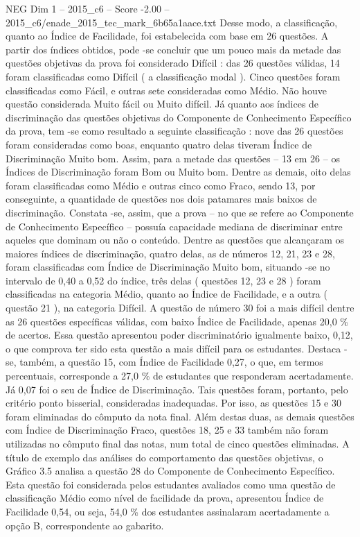 \begin{textsample}{NEG Dim 1 – 2015\_c6 – Score -2.00 – 2015\_c6/enade\_2015\_tec\_mark\_6b65a1aace.txt}
Desse modo, a classificação, quanto ao Índice de Facilidade, foi estabelecida com base em 26 questões.
A partir dos índices obtidos, pode -se concluir que um pouco mais da metade das questões objetivas da prova foi considerado Difícil : das 26 questões válidas, 14 foram classificadas como Difícil ( a classificação modal ).
Cinco questões foram classificadas como Fácil, e outras sete consideradas como Médio.
Não houve questão considerada Muito fácil ou Muito difícil.
Já quanto aos índices de discriminação das questões objetivas do Componente de Conhecimento Específico da prova, tem -se como resultado a seguinte classificação : nove das 26 questões foram consideradas como boas, enquanto quatro delas tiveram Índice de Discriminação Muito bom.
Assim, para a metade das questões – 13 em 26 – os Índices de Discriminação foram Bom ou Muito bom.
Dentre as demais, oito delas foram classificadas como Médio e outras cinco como Fraco, sendo 13, por conseguinte, a quantidade de questões nos dois patamares mais baixos de discriminação.
Constata -se, assim, que a prova – no que se refere ao Componente de Conhecimento Específico – possuía capacidade mediana de discriminar entre aqueles que dominam ou não o conteúdo.
Dentre as questões que alcançaram os maiores índices de discriminação, quatro delas, as de números 12, 21, 23 e 28, foram classificadas com Índice de Discriminação Muito bom, situando -se no intervalo de 0,40 a 0,52 do índice, três delas ( questões 12, 23 e 28 ) foram classificadas na categoria Médio, quanto ao Índice de Facilidade, e a outra ( questão 21 ), na categoria Difícil.
A questão de número 30 foi a mais difícil dentre as 26 questões específicas válidas, com baixo Índice de Facilidade, apenas 20,0 \% de acertos.
Essa questão apresentou poder discriminatório igualmente baixo, 0,12, o que comprova ter sido esta questão a mais difícil para os estudantes.
Destaca -se, também, a questão 15, com Índice de Facilidade 0,27, o que, em termos percentuais, corresponde a 27,0 \% de estudantes que responderam acertadamente.
Já 0,07 foi o seu de Índice de Discriminação.
Tais questões foram, portanto, pelo critério ponto bisserial, consideradas inadequadas.
Por isso, as questões 15 e 30 foram eliminadas do cômputo da nota final.
Além destas duas, as demais questões com Índice de Discriminação Fraco, questões 18, 25 e 33 também não foram utilizadas no cômputo final das notas, num total de cinco questões eliminadas.
A título de exemplo das análises do comportamento das questões objetivas, o Gráfico 3.5 analisa a questão 28 do Componente de Conhecimento Específico.
Esta questão foi considerada pelos estudantes avaliados como uma questão de classificação Médio como nível de facilidade da prova, apresentou Índice de Facilidade 0,54, ou seja, 54,0 \% dos estudantes assinalaram acertadamente a opção B, correspondente ao gabarito.

\end{textsample}
